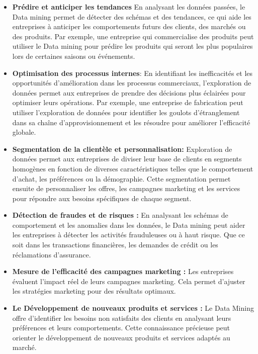 \documentclass[a4paper,14pt]{article}
\begin{document}
        \begin{itemize}
            \item \textbf{Prédire et anticiper les tendances}
            En analysant les données passées, le Data mining permet de détecter des schémas et des tendances, ce qui aide les entreprises à anticiper les comportements futurs des clients, des marchés ou des produits. 
            Par exemple, une entreprise qui commercialise des produits peut utiliser le Data mining pour prédire les produits qui seront les plus populaires lors de certaines saisons ou événements.
            \item \textbf{Optimisation des processus internes}:
            En identifiant les inefficacités et les opportunités d'amélioration dans les processus commerciaux, l'exploration de données permet aux entreprises de prendre des décisions plus éclairées pour optimiser leurs opérations. 
            Par exemple, une entreprise de fabrication peut utiliser l'exploration de données pour identifier les goulots d'étranglement dans sa chaîne d'approvisionnement et les résoudre pour améliorer l'efficacité globale.
            \item \textbf{Segmentation de la clientèle et personnalisation: }
            Exploration de données permet aux entreprises de diviser leur base de clients en segments homogènes en fonction de diverses caractéristiques telles que le comportement d'achat, les préférences ou la démographie. Cette segmentation permet ensuite de personnaliser les offres, les campagnes marketing et les services pour répondre aux besoins spécifiques de chaque segment.
            \item \textbf{Détection de fraudes et de risques :}
            En analysant les schémas de comportement et les anomalies dans les données, le Data mining peut aider les entreprises à détecter les activités frauduleuses ou à haut risque. Que ce soit dans les transactions financières, les demandes de crédit ou les réclamations d'assurance.
            \item \textbf{Mesure de l’efficacité des campagnes marketing :}
            Les entreprises évaluent l’impact réel de leurs campagnes marketing. Cela permet d’ajuster les stratégies marketing pour des résultats optimaux.
            \item \textbf{Le Développement de nouveaux produits et services :}
            Le Data Mining offre d’identifier les besoins non satisfaits des clients en analysant leurs préférences et leurs comportements. Cette connaissance précieuse peut orienter le développement de nouveaux produits et services adaptés au marché.
        \end{itemize}
\end{document}
